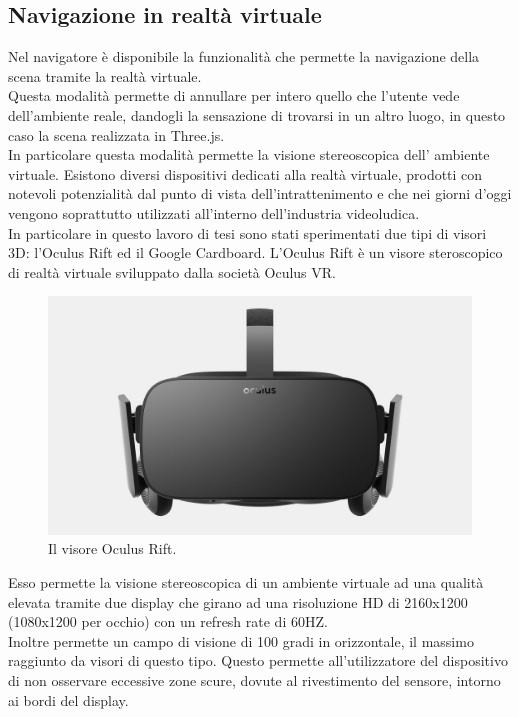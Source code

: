 \subsection{Navigazione in realtà virtuale}
Nel navigatore è disponibile la funzionalità che permette la navigazione della scena tramite la realtà virtuale.
\\
Questa modalità permette di annullare per intero quello che l’utente vede dell’ambiente reale, dandogli la sensazione di trovarsi in un altro luogo, in questo caso la scena realizzata in Three.js.
\\
In particolare questa modalità permette la visione stereoscopica dell’ ambiente virtuale.
Esistono diversi dispositivi dedicati alla realtà virtuale, prodotti con notevoli potenzialità dal punto di vista dell’intrattenimento e che nei giorni d’oggi vengono soprattutto utilizzati all’interno dell’industria videoludica.
\\
In particolare in questo lavoro di tesi sono stati sperimentati due tipi di visori 3D: l’Oculus Rift ed il Google Cardboard. 
L’Oculus Rift è un visore steroscopico di realtà virtuale sviluppato dalla società Oculus VR.
\begin{figure}[htb]
 \centering
 \includegraphics[width=1\linewidth]{images/chapter_navigazione_scena/oculus.jpg}\hfill
 \caption[Il visore Oculus Rift.]{Il visore Oculus Rift.}
 \label{fig:navigazione_scena_navigator_oculus}
\end{figure}
Esso permette la visione stereoscopica di un ambiente virtuale ad una qualità elevata tramite due display che girano ad una risoluzione HD di 2160x1200 (1080x1200 per occhio) con un refresh rate di 60HZ.
\\
Inoltre permette un campo di visione di 100 gradi in orizzontale, il massimo raggiunto da visori di questo tipo. Questo permette all’utilizzatore del dispositivo di non osservare eccessive zone scure, dovute al rivestimento del sensore, intorno ai bordi del display. 
